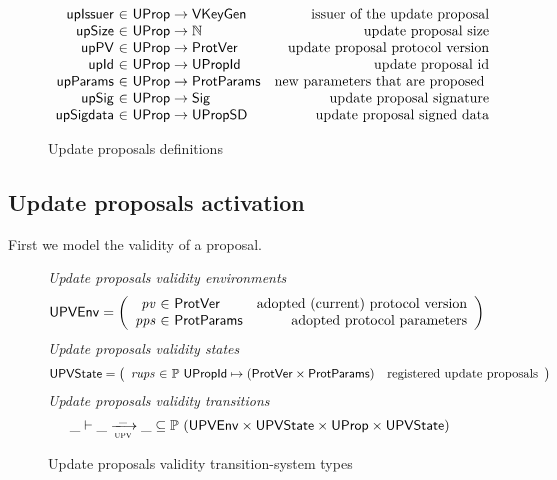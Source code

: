 \begin{figure}[htb]
  \begin{equation*}
    \begin{array}{r@{~\in~}lr}
      \fun{upIssuer} & \UProp \to \VKeyGen & \text{issuer of the update proposal}\\
      \fun{upSize} & \UProp \to \mathbb{N} & \text{update proposal size}\\
      \fun{upPV} & \UProp \to \ProtVer & \text{update proposal protocol version}\\
      \fun{upId} & \UProp \to \UPropId & \text{update proposal id}\\
      \fun{upParams} & \UProp \to \mathbb{\ProtParams}
                                           & \text{new parameters that are proposed }\\
      \fun{upSig} & \UProp \to \Sig & \text{update proposal signature}\\
      \fun{upSigdata} & \UProp \to \UPropSD & \text{update proposal signed data}
    \end{array}
  \end{equation*}
  \caption{Update proposals definitions}
  \label{fig:defs:update-proposals}
\end{figure}

\subsection{Update proposals activation}
\label{sec:update-proposals-activation}

First we model the validity of a proposal.

\begin{figure}[htb]
  \emph{Update proposals validity environments}
  \begin{equation*}
    \UPVEnv =
    \left(
      \begin{array}{r@{~\in~}lr}
        \var{pv} & \ProtVer & \text{adopted (current) protocol version}\\
        \var{pps} & \ProtParams & \text{adopted protocol parameters}\\
      \end{array}
    \right)
  \end{equation*}
  \emph{Update proposals validity states}
  \begin{equation*}
    \UPVState
    = \left(
      \begin{array}{r@{~\in~}lr}
        \var{rups} & \powerset{\UPropId \mapsto (\ProtVer \times \ProtParams)}
        & \text{registered update proposals}\\
      \end{array}
    \right)
  \end{equation*}
  \emph{Update proposals validity transitions}
    \begin{equation*}
    \var{\_} \vdash
    \var{\_} \trans{upv}{\_} \var{\_}
    \subseteq \powerset (\UPVEnv \times \UPVState \times \UProp \times \UPVState)
  \end{equation*}
  \caption{Update proposals validity transition-system types}
  \label{fig:ts-types:up-validity}
\end{figure}

